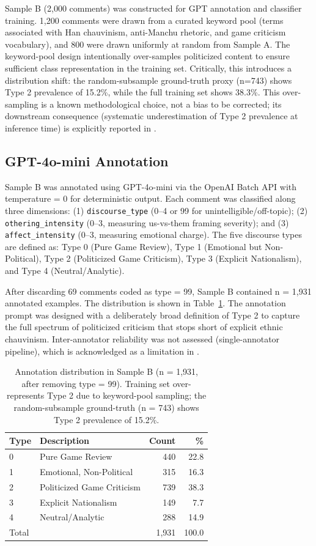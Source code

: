 \documentclass[man, 12pt, mask, floatsintext]{apa7}
\begin{document}
Sample B (2,000 comments) was constructed for GPT annotation and classifier training. 1,200 comments were drawn from a curated keyword pool (terms associated with Han chauvinism, anti-Manchu rhetoric, and game criticism vocabulary), and 800 were drawn uniformly at random from Sample A. The keyword-pool design intentionally over-samples politicized content to ensure sufficient class representation in the training set. Critically, this introduces a distribution shift: the random-subsample ground-truth proxy (n=743) shows Type 2 prevalence of 15.2\%, while the full training set shows 38.3\%. This over-sampling is a known methodological choice, not a bias to be corrected; its downstream consequence (systematic underestimation of Type 2 prevalence at inference time) is explicitly reported in .

\subsection{GPT-4o-mini Annotation}
Sample B was annotated using GPT-4o-mini via the OpenAI Batch API with temperature = 0 for deterministic output. Each comment was classified along three dimensions: (1) \texttt{discourse\_type} (0--4 or 99 for unintelligible/off-topic); (2) \texttt{othering\_intensity} (0--3, measuring us-vs-them framing severity); and (3) \texttt{affect\_intensity} (0--3, measuring emotional charge). The five discourse types are defined as: Type 0 (Pure Game Review), Type 1 (Emotional but Non-Political), Type 2 (Politicized Game Criticism), Type 3 (Explicit Nationalism), and Type 4 (Neutral/Analytic).

After discarding 69 comments coded as type = 99, Sample B contained n = 1,931 annotated examples. The distribution is shown in Table~\ref{tab:annotation}. The annotation prompt was designed with a deliberately broad definition of Type 2 to capture the full spectrum of politicized criticism that stops short of explicit ethnic chauvinism. Inter-annotator reliability was not assessed (single-annotator pipeline), which is acknowledged as a limitation in .

\begin{table}[!htbp]
\centering
\caption{Annotation distribution in Sample B (n = 1,931, after removing type = 99). Training set over-represents Type 2 due to keyword-pool sampling; the random-subsample ground-truth (n = 743) shows Type 2 prevalence of 15.2\%.}
\label{tab:annotation}
\begin{tabular}{llrr}
\toprule
Type & Description & Count & \% \\
\midrule
0 & Pure Game Review & 440 & 22.8 \\
1 & Emotional, Non-Political & 315 & 16.3 \\
2 & Politicized Game Criticism & 739 & 38.3 \\
3 & Explicit Nationalism & 149 & 7.7 \\
4 & Neutral/Analytic & 288 & 14.9 \\
\midrule
Total & & 1,931 & 100.0 \\
\bottomrule
\end{tabular}
\end{table}
\end{document}
